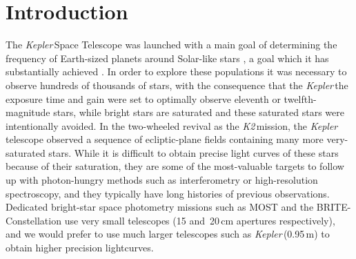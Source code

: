 \documentclass[modern]{aastex62}
\newcommand\kepler{\emph{Kepler}\,}
\newcommand\ktwo{\emph{K2}\,}
\begin{document}


\section{Introduction} 
\label{sec:intro}

The \kepler Space Telescope was launched with a main goal of determining the frequency of Earth-sized planets around Solar-like stars \citep{2010sci...327..977b}, a goal which it has substantially achieved \citep[e.g.][]{2013ApJ...766...81F,2013PNAS..11019273P,2014ApJ...795...64F}. In order to explore these populations it was necessary to observe hundreds of thousands of stars, with the consequence that the \kepler the exposure time and gain were set to optimally observe eleventh or twelfth-magnitude stars, while bright stars are saturated and these saturated stars were intentionally avoided. In the two-wheeled revival as the \ktwo mission, the \kepler telescope observed a sequence of ecliptic-plane fields containing many more very-saturated stars. While it is difficult to obtain precise light curves of these stars because of their saturation, they are some of the most-valuable targets to follow up with photon-hungry methods such as interferometry or high-resolution spectroscopy, and they typically have long histories of previous observations. Dedicated bright-star space photometry missions such as MOST \citep{most} and the BRITE-Constellation \citep{brite,brite2} use very small telescopes (15 and~20\,cm apertures respectively), and we would prefer to use much larger telescopes such as \kepler (0.95\,m) to obtain higher precision lightcurves. 
\end{document}
